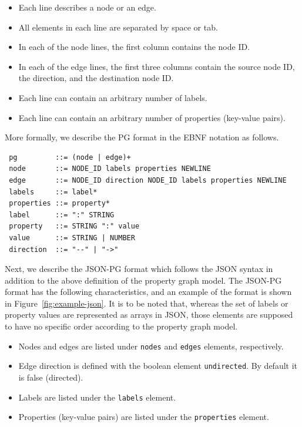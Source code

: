 \documentclass[runningheads]{llncs}
\begin{document}
\begin{itemize}
    \item Each line describes a node or an edge.
    \item All elements in each line are separated by space or tab.
    \item In each of the node lines, the first column contains the node ID.
    \item In each of the edge lines, the first three columns contain the source node ID, the direction, and the destination node ID.
    \item Each line can contain an arbitrary number of labels.
    \item Each line can contain an arbitrary number of properties (key-value pairs).
\end{itemize}

More formally, we describe the PG format in the EBNF notation as follows.

\begin{defi}
\leavevmode
\begin{verbatim}
 pg         ::= (node | edge)+
 node       ::= NODE_ID labels properties NEWLINE
 edge       ::= NODE_ID direction NODE_ID labels properties NEWLINE
 labels     ::= label*
 properties ::= property*
 label      ::= ":" STRING
 property   ::= STRING ":" value
 value      ::= STRING | NUMBER
 direction  ::= "--" | "->"
\end{verbatim}
\end{defi}

Next, we describe the JSON-PG format which follows the JSON syntax in addition to the above definition of the property graph model. The JSON-PG format has the following characteristics, and an example of the format is shown in Figure~\ref{fig:example-json}. It is to be noted that, whereas the set of labels or property values are represented as arrays in JSON, those elements are supposed to have no specific order according to the property graph model.

\begin{itemize}
    \item Nodes and edges are listed under \texttt{nodes} and \texttt{edges} elements, respectively.
    \item Edge direction is defined with the boolean element \texttt{undirected}. By default it is false (directed).
    \item Labels are listed under the \texttt{labels} element.
    \item Properties (key-value pairs) are listed under the \texttt{properties} element.
\end{itemize}
\end{document}
